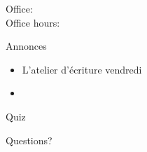 \documentclass{beamer}
\subtitle[Passé composé (\lexi{être})]{Le passé composé avec \lexi{être} et plus d'aliments}
\begin{document}
  \begin{frame}
    \titlepage
    \tiny{Office: \\
          Office hours: }
  \end{frame}

  \begin{frame}{Annonces}
    \begin{itemize}
      \item L'atelier d'écriture vendredi
      \item[] 
    \end{itemize}
  \end{frame}

  \begin{frame}{}
    \begin{center}
      \Large Quiz
    \end{center}
  \end{frame}



  \begin{frame}{}
    \begin{center}
      \Large Questions?
    \end{center}
  \end{frame}
\end{document}
